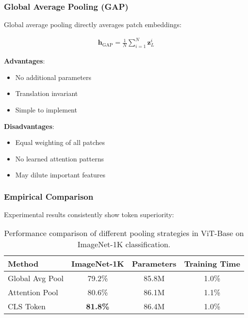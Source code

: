 \subsubsection{Global Average Pooling (GAP)}

Global average pooling directly averages patch embeddings:

\begin{align}
\mathbf{h}_{\text{GAP}} = \frac{1}{N} \sum_{i=1}^{N} \mathbf{z}_L^i
\end{align}

\textbf{Advantages}:
\begin{itemize}
\item No additional parameters
\item Translation invariant
\item Simple to implement
\end{itemize}

\textbf{Disadvantages}:
\begin{itemize}
\item Equal weighting of all patches
\item No learned attention patterns
\item May dilute important features
\end{itemize}

\subsubsection{Empirical Comparison}

Experimental results consistently show \cls{} token superiority:

\begin{table}[htbp]
\centering
\begin{tabular}{lccc}
\toprule
\textbf{Method} & \textbf{ImageNet-1K} & \textbf{Parameters} & \textbf{Training Time} \\
\midrule
Global Avg Pool & 79.2\% & 85.8M & 1.0\% \\
Attention Pool & 80.6\% & 86.1M & 1.1\% \\
CLS Token & \textbf{81.8\%} & 86.4M & 1.0\% \\
\bottomrule
\end{tabular}
\caption{Performance comparison of different pooling strategies in ViT-Base on ImageNet-1K classification.}
\begin{comment}
Feedback: Tables with specific numbers can be misleading if the context isn't provided (e.g., which paper, what training setup). It's safer and often more honest to make the comparison qualitative or cite the source directly. For example, you could change the caption to: "Illustrative performance comparison... based on results from [Citation]. Actual performance may vary." Or, you could rephrase the text to say: "Experiments in the original ViT paper and subsequent work have generally found that using a dedicated [CLS] token outperforms simple pooling strategies like Global Average Pooling by a notable margin, justifying the small increase in parameters."
\end{comment}
\end{table}

